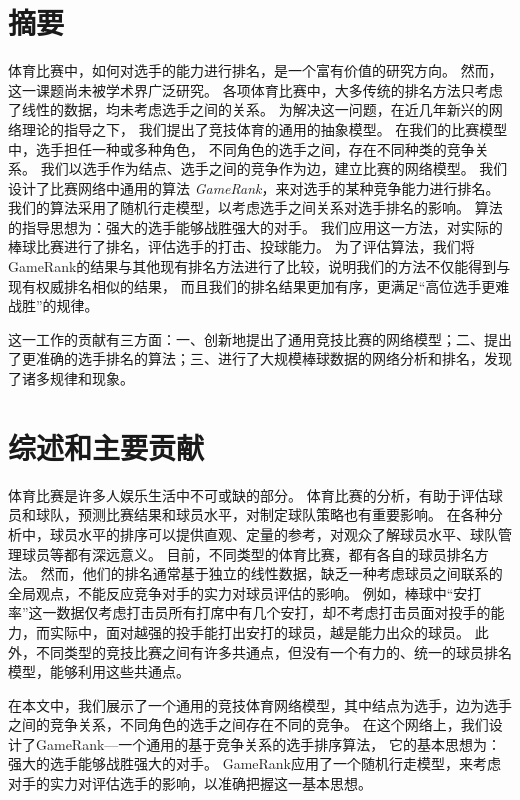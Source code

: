 \section{摘要}

体育比赛中，如何对选手的能力进行排名，是一个富有价值的研究方向。 然而，这一课题尚未被学术界广泛研究。
各项体育比赛中，大多传统的排名方法只考虑了线性的数据，均未考虑选手之间的关系。 为解决这一问题，在近几年新兴的网络理论的指导之下，
我们提出了竞技体育的通用的抽象模型。 在我们的比赛模型中，选手担任一种或多种角色， 不同角色的选手之间，存在不同种类的竞争关系。
我们以选手作为结点、选手之间的竞争作为边，建立比赛的网络模型。 我们设计了比赛网络中通用的算法
\emph{GameRank}，来对选手的某种竞争能力进行排名。 我们的算法采用了随机行走模型，以考虑选手之间关系对选手排名的影响。
算法的指导思想为：强大的选手能够战胜强大的对手。 我们应用这一方法，对实际的棒球比赛进行了排名，评估选手的打击、投球能力。
为了评估算法，我们将GameRank的结果与其他现有排名方法进行了比较，说明我们的方法不仅能得到与现有权威排名相似的结果，
而且我们的排名结果更加有序，更满足``高位选手更难战胜''的规律。

这一工作的贡献有三方面：一、创新地提出了通用竞技比赛的网络模型；二、提出了更准确的选手排名的算法；三、进行了大规模棒球数据的网络分析和排名，发现了诸多规律和现象。

\section{综述和主要贡献}

体育比赛是许多人娱乐生活中不可或缺的部分。 体育比赛的分析，有助于评估球员和球队，预测比赛结果和球员水平，对制定球队策略也有重要影响。
在各种分析中，球员水平的排序可以提供直观、定量的参考，对观众了解球员水平、球队管理球员等都有深远意义。
目前，不同类型的体育比赛，都有各自的球员排名方法。
然而，他们的排名通常基于独立的线性数据，缺乏一种考虑球员之间联系的全局观点，不能反应竞争对手的实力对球员评估的影响。
例如，棒球中``安打率''这一数据仅考虑打击员所有打席中有几个安打，却不考虑打击员面对投手的能力，而实际中，面对越强的投手能打出安打的球员，越是能力出众的球员。
此外，不同类型的竞技比赛之间有许多共通点，但没有一个有力的、统一的球员排名模型，能够利用这些共通点。

在本文中，我们展示了一个通用的竞技体育网络模型，其中结点为选手，边为选手之间的竞争关系，不同角色的选手之间存在不同的竞争。
在这个网络上，我们设计了GameRank---一个通用的基于竞争关系的选手排序算法， 它的基本思想为：强大的选手能够战胜强大的对手。
GameRank应用了一个随机行走模型，来考虑对手的实力对评估选手的影响，以准确把握这一基本思想。

